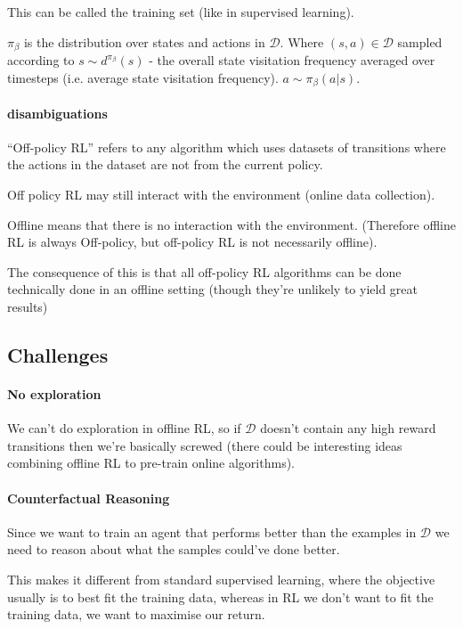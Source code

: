 \documentclass{article}
\begin{document}
This can be called the training set (like in supervised learning).


\(\pi_{\beta}\) is the distribution over states and actions in \(\mathcal{D}\). Where \( (s,a) \in \mathcal{D} \) sampled according to \(s \sim d^{\pi_{\beta}}(s)\) - the overall state visitation frequency averaged over timesteps (i.e. average state visitation frequency). \(a \sim \pi_{\beta} (a | s)\).

\paragraph{disambiguations}
``Off-policy RL'' refers to any algorithm which uses datasets of transitions where the actions in the dataset are not from the current policy.


Off policy RL may still interact with the environment (online data collection).


Offline means that there is no interaction with the environment.
(Therefore offline RL is always Off-policy, but off-policy RL is not necessarily offline).


The consequence of this is that all off-policy RL algorithms can be done technically done in an offline setting (though they're unlikely to yield great results)



\subsection{Challenges}
\paragraph{No exploration} We can't do exploration in offline RL, so if \(\mathcal{D}\) doesn't contain any high reward transitions then we're basically screwed (there could be interesting ideas combining offline RL to pre-train online algorithms).
\paragraph{Counterfactual Reasoning} Since we want to train an agent that performs better than the examples in \(\mathcal{D}\) we need to reason about what the samples could've done better.


This makes it different from standard supervised learning, where the objective usually is to best fit the training data, whereas in RL we don't want to fit the training data, we want to maximise our return.
\end{document}
